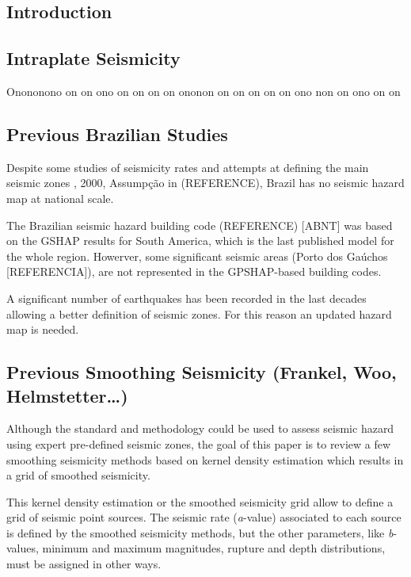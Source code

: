 \documentclass[draft, grl]{agutex}
\begin{document}
\begin{article}

\section{Introduction}

\subsection{Intraplate Seismicity}

Onononono on on ono on on on on ononon on on on on on ono non on ono on on

\subsection{Previous Brazilian Studies}

Despite some studies of seismicity rates and attempts at defining the main seismic zones \citep{berrocal_1984}, 2000, Assumpção in \citep{talwani_2014} (REFERENCE), Brazil has no seismic hazard map at national scale.

The Brazilian seismic hazard building code (REFERENCE) [ABNT] was based on the GSHAP results for South America, which is the last published model for the whole region. Howerver, some significant seismic areas (Porto dos Gaúchos [REFERENCIA]), are not represented in the GPSHAP-based building codes.

A significant number of earthquakes has been recorded in the last decades allowing a better definition of seismic zones. For this reason an updated hazard map is needed.


\subsection{Previous Smoothing Seismicity (Frankel, Woo, Helmstetter\ldots)}

Although the standard \citet{cornell_1968} and \citet{mcguire_1976} methodology could be used to assess seismic hazard using expert pre-defined seismic zones, the goal of this paper is to review a few smoothing seismicity methods based on kernel density estimation which results in a grid of smoothed seismicity.

This kernel density estimation or the smoothed seismicity grid allow to define a grid of seismic point sources. The seismic rate (\emph{a}-value) associated to each source is defined by the smoothed seismicity methods, but the other parameters, like \emph{b}-values, minimum and maximum magnitudes, rupture and depth distributions, must be assigned in other ways.


\end{article}
\end{document}
